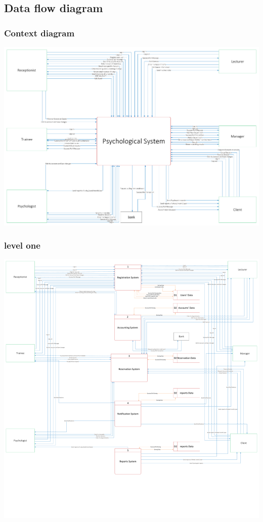 \documentclass[../Psychological_system_web_application.tex]{subfiles}
\begin{document}
			\subsection{Data flow diagram}
				\subsubsection{Context diagram}
					\includegraphics[width=\textwidth ,height=0.9\textheight ,scale=4]{Diagrams/Data-Flow_Context.pdf}
					
				\subsubsection{level one}
					\includegraphics[width=\textwidth ,height=0.9\textheight ,scale=4]{Diagrams/Data-Flow_level0.pdf}
					
\end{document}
